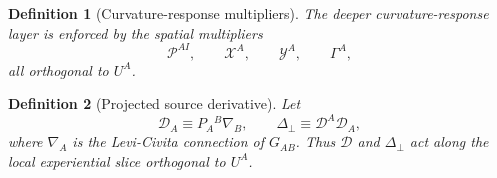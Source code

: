 \documentclass[11pt]{article}
\newcommand{\ProjSub}{P}
\newcommand{\SpatialD}{\mathcal D}
\newcommand{\LapPerp}{\Delta_\perp}
\newcommand{\ConstGamma}{\Gamma}
\newcommand{\CurvQMult}{\mathscr P}
\newcommand{\CurvChiMult}{\mathscr X}
\newcommand{\CurvTransMult}{\mathscr Y}
\newtheorem{definition}{Definition}
\begin{document}
\begin{definition}[Curvature-response multipliers]
\label{def:curvmults}
The deeper curvature-response layer is enforced by the spatial multipliers
\begin{equation}
\CurvQMult^{AI},
\qquad
\CurvChiMult^A,
\qquad
\CurvTransMult^A,
\qquad
\ConstGamma^A,
\label{eq:curvmults}
\end{equation}
all orthogonal to \(U^A\).
\end{definition}

\begin{definition}[Projected source derivative]
\label{def:projected}
Let
\begin{equation}
\SpatialD_A\equiv \ProjSub_A{}^B\nabla_B,
\qquad
\LapPerp\equiv \SpatialD^A\SpatialD_A,
\label{eq:projderiv}
\end{equation}
where \(\nabla_A\) is the Levi-Civita connection of \(G_{AB}\). Thus \(\SpatialD\) and \(\LapPerp\) act along the local experiential slice orthogonal to \(U^A\).
\end{definition}
\end{document}
